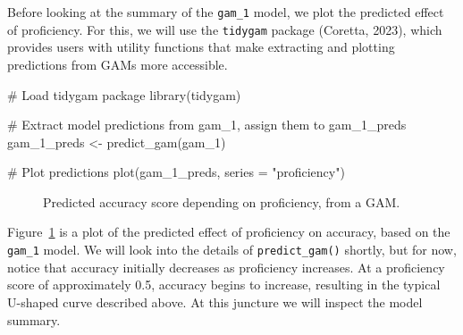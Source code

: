 \documentclass[
  letterpaper,
  DIV=11,
  numbers=noendperiod]{scrartcl}
\newenvironment{Shaded}{\begin{snugshade}}{\end{snugshade}}
\newcommand{\AttributeTok}[1]{\textcolor[rgb]{0.40,0.45,0.13}{#1}}
\newcommand{\CommentTok}[1]{\textcolor[rgb]{0.37,0.37,0.37}{#1}}
\newcommand{\FunctionTok}[1]{\textcolor[rgb]{0.28,0.35,0.67}{#1}}
\newcommand{\NormalTok}[1]{\textcolor[rgb]{0.00,0.23,0.31}{#1}}
\newcommand{\OtherTok}[1]{\textcolor[rgb]{0.00,0.23,0.31}{#1}}
\newcommand{\StringTok}[1]{\textcolor[rgb]{0.13,0.47,0.30}{#1}}
\begin{document}
Before looking at the summary of the \texttt{gam\_1} model, we plot the
predicted effect of proficiency. For this, we will use the
\texttt{tidygam} package (Coretta, 2023), which provides users with
utility functions that make extracting and plotting predictions from
GAMs more accessible.

\begin{Shaded}
\begin{Highlighting}[]
\CommentTok{\# Load tidygam package}
\FunctionTok{library}\NormalTok{(tidygam)}

\CommentTok{\# Extract model predictions from \textquotesingle{}gam\_1\textquotesingle{}, assign them to \textquotesingle{}gam\_1\_preds\textquotesingle{}}
\NormalTok{gam\_1\_preds }\OtherTok{\textless{}{-}} \FunctionTok{predict\_gam}\NormalTok{(gam\_1)}

\CommentTok{\# Plot predictions}
\FunctionTok{plot}\NormalTok{(gam\_1\_preds, }\AttributeTok{series =} \StringTok{"proficiency"}\NormalTok{)}
\end{Highlighting}
\end{Shaded}

\begin{figure}[H]


\caption{\label{fig-gam-1}Predicted accuracy score depending on
proficiency, from a GAM.}

\end{figure}%

Figure~\ref{fig-gam-1} is a plot of the predicted effect of proficiency
on accuracy, based on the \texttt{gam\_1} model. We will look into the
details of \texttt{predict\_gam()} shortly, but for now, notice that
accuracy initially decreases as proficiency increases. At a proficiency
score of approximately 0.5, accuracy begins to increase, resulting in
the typical U-shaped curve described above. At this juncture we will
inspect the model summary.
\end{document}
